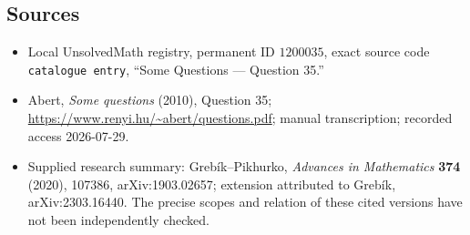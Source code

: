\documentclass[11pt]{article}
\begin{document}
\subsection{Sources}
\begin{itemize}
\item Local UnsolvedMath registry, permanent ID \(1200035\), exact source code \texttt{catalogue entry}, ``Some Questions --- Question 35.''
\item Abert, \emph{Some questions} (2010), Question 35; \url{https://www.renyi.hu/~abert/questions.pdf}; manual transcription; recorded access 2026-07-29.
\item Supplied research summary: Greb\'ik--Pikhurko, \emph{Advances in Mathematics} \textbf{374} (2020), 107386, arXiv:1903.02657; extension attributed to Greb\'ik, arXiv:2303.16440. The precise scopes and relation of these cited versions have not been independently checked.
\end{itemize}
\end{document}
